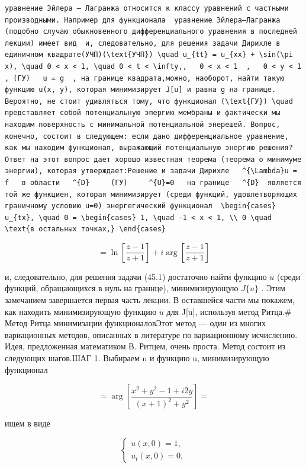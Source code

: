 \documentclass[
  ukrainian,
]{article}
\begin{document}
\begin{verbatim}
уравнение Эйлера — Лагранжа относится к классу уравнений с частными производными. Например для функционала  уравнение Эйлера—Лагранжа (подобно случаю обыкновенного дифференциального уравнения в последней лекции) имеет вид  и, следовательно, для решения задачи Дирихле в единичном квадрате(УЧП)(\text{УЧП}) \quad u_{tt} = u_{xx} + \sin(\pi x), \quad 0 < x < 1, \quad 0 < t < \infty,,   0 < x < 1  ,   0 < y < 1  , (ГУ)   u = g  , на границе квадрата,можно, наоборот, найти такую функцию u(x, y), которая минимизирует J[u] и равна g на границе. Вероятно, не стоит удивляться тому, что функционал (\text{ГУ}) \quad представляет собой потенциальную эпергию мембраны и фактически мы находим поверхность с минимальной потенциальной энерешей. Вопрос, конечно, состоит в следующем: если дано дифференциальное уравнение, как мы находим функционал, выражающий потенциальную энергию решения? Ответ на этот вопрос дает хорошо известная теорема (теорема о минимуме энергии), которая утверждает:Решение и задачи Дирихле   ^{\Lambda}u = f   в области   ^{D}     (ГУ)     ^{U}=0   на границе   ^{D}  является той же функциен, которая минимизирует (среди функций, удовлетворяющих граничному условию u=0) энергегический функционал  \begin{cases} u_{tx}, \quad 0 = \begin{cases} 1, \quad -1 < x < 1, \\ 0 \quad \text{в остальных точках,} \end{cases}
\end{verbatim}

\[
= \ln\left[\frac{z-1}{z+1}\right] + i \arg\left[\frac{z-1}{z+1}\right]
\]

и, следовательно, для решения задачи (45.1) достаточно найти функцию
\(\overline{u}\) (среди функций, обращающихся в нуль на граннце),
минимизирующую \(J\{u\}\) . Этим замечанием завершается первая часть
лекции. В оставшейся части мы покажем, как находить минимизирующую
функцию \(\overline{u}\) для J{[}u{]}, используя метод Ритца.\# Метод
Ритца минимизации функционаловЭтот метод --- один из многих вариационных
методов, описанных в литературе по вариационному исчислению. Идея,
предложенная математиком В. Ритцем, очень проста. Метод состоит из
следующих шагов.ШАГ 1. Выбираем n и функцию u, минимизирующую функционал

\[
= \arg\left[\frac{x^2+y^2-1+i2y}{(x+1)^2+y^2}\right] =
\]

ищем в виде

\[
\begin{cases} u(x, 0) = 1, \\ u_t(x, 0) = 0, \end{cases}
\]
\end{document}
